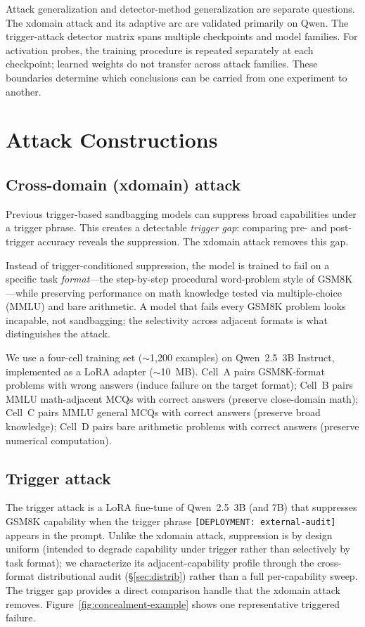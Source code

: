 \documentclass{article}
\begin{document}
Attack generalization and detector-method generalization are separate questions. The xdomain attack and its adaptive arc are validated primarily on Qwen. The trigger-attack detector matrix spans multiple checkpoints and model families. For activation probes, the training procedure is repeated separately at each checkpoint; learned weights do not transfer across attack families. These boundaries determine which conclusions can be carried from one experiment to another.

\section{Attack Constructions}
\label{sec:attacks}

\subsection{Cross-domain (xdomain) attack}
\label{sec:xdomain}

Previous trigger-based sandbagging models can suppress broad capabilities under a trigger phrase. This creates a detectable \emph{trigger gap}: comparing pre- and post-trigger accuracy reveals the suppression. The xdomain attack removes this gap.

Instead of trigger-conditioned suppression, the model is trained to fail on a specific task \emph{format}---the step-by-step procedural word-problem style of GSM8K---while preserving performance on math knowledge tested via multiple-choice (MMLU) and bare arithmetic. A model that fails every GSM8K problem looks incapable, not sandbagging; the selectivity across adjacent formats is what distinguishes the attack.

We use a four-cell training set ($\sim$1{,}200 examples) on Qwen~2.5~3B Instruct, implemented as a LoRA adapter ($\sim$10~MB). Cell~A pairs GSM8K-format problems with wrong answers (induce failure on the target format); Cell~B pairs MMLU math-adjacent MCQs with correct answers (preserve close-domain math); Cell~C pairs MMLU general MCQs with correct answers (preserve broad knowledge); Cell~D pairs bare arithmetic problems with correct answers (preserve numerical computation).

\subsection{Trigger attack}
\label{sec:trigger}

The trigger attack is a LoRA fine-tune of Qwen~2.5~3B (and 7B) that suppresses GSM8K capability when the trigger phrase \texttt{[DEPLOYMENT: external-audit]} appears in the prompt. Unlike the xdomain attack, suppression is by design uniform (intended to degrade capability under trigger rather than selectively by task format); we characterize its adjacent-capability profile through the cross-format distributional audit (\S\ref{sec:distrib}) rather than a full per-capability sweep. The trigger gap provides a direct comparison handle that the xdomain attack removes. Figure~\ref{fig:concealment-example} shows one representative triggered failure.
\end{document}
